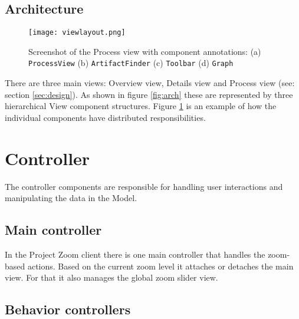 \subsection{Architecture}

\begin{figure}
\texttt{[image: viewlayout.png]}
\caption[Screenshot of the Process view with component annotations]{Screenshot of the Process view with component annotations: (a) \texttt{ProcessView} \quad (b) \texttt{ArtifactFinder} \quad (c) \texttt{Toolbar} \quad (d) \texttt{Graph}}
\label{fig:viewlayout}
\end{figure}

There are three main views: Overview view, Details view and Process view (see: section \ref{sec:design}). As shown in figure \ref{fig:arch} these are represented by three hierarchical View component structures. Figure \ref{fig:viewlayout} is an example of how the individual components have distributed responsibilities.

\section{Controller}

The controller components are responsible for handling user interactions and manipulating the data in the Model.

\subsection{Main controller}
In the Project Zoom client there is one main controller that handles the zoom-based actions. Based on the current zoom level it attaches or detaches the main view. For that it also manages the global zoom slider view. 


\subsection{Behavior controllers}


